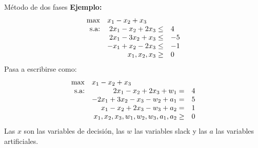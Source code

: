 \documentclass[10pt, aspectratio=169]{beamer}
\begin{document}
    \begin{frame}{Método de dos fases}
        \textbf{Ejemplo:}
        \[
            \begin{array}{rrl}
                \max & \multicolumn{2}{l}{x_1-x_2+x_3} \\
                \text{s.a:} & 2x_1-x_2+2x_3 \leq & 4  \\
                & 2x_1-3x_2+x_3 \leq & -5 \\
                & -x_1+x_2-2x_3 \leq & -1 \\
                & x_1,x_2,x_3 \geq   & 0
            \end{array}
        \]
        Pasa a escribirse como:
        \[
            \begin{array}{rrl}
                \max & \multicolumn{2}{l}{x_1-x_2+x_3} \\
                \text{s.a:} & 2x_1-x_2+2x_3 +w_1=                  & 4 \\
                & -2x_1+3x_2-x_3-w_2+a_1 =             & 5 \\
                & x_1-x_2+2x_3-w_3+a_2 =               & 1 \\
                & x_1,x_2,x_3,w_1,w_2,w_3,a_1,a_2 \geq & 0
            \end{array}
        \]
        Las $x$ son las variables de decisión, las $w$ las variables slack y las $a$ las variables artificiales.
    \end{frame}
\end{document}
